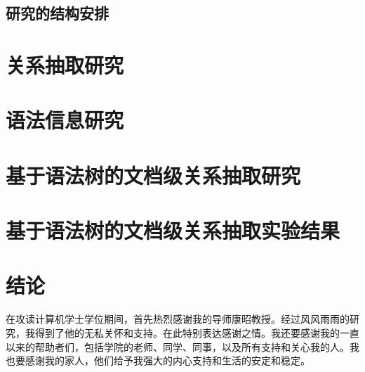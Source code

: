 \documentclass[bachelor]{thesis-uestc}
\begin{document}
\section{研究的结构安排}

\begin{comment}
    课题的方案论证，包括课题的主要任务，功能要求，性能指标等
    课题的工作
    A. 理论课题
(a) 理论基础和原理
(b) 理论分析、推导、数学模型
(c) 模型仿真（含数据、曲线等）

also: 图表的标注先写在图表的上方，明天再次询问这个问题
\end{comment}
\chapter{关系抽取研究}

\newpage

\chapter{语法信息研究}
\newpage
\chapter{基于语法树的文档级关系抽取研究}
\newpage
\chapter{基于语法树的文档级关系抽取实验结果}
\newpage
\chapter{结论}
\begin{comment}
    在工作总结的基础上，经过分析、归纳，明确结论：
①系统功能、指标等是否实现或达到课题要求（工程技
术及软件课题）
②理论结果是否正确、所建模型是否合理（理论课题）
41③所阐述的观点是否正确（文科课题）
④本课题有待进一步解决的问题及方向
⑤本人收获及体会
\end{comment}
\thesisacknowledgement
在攻读计算机学士学位期间，首先热烈感谢我的导师康昭教授。经过风风雨雨的研究，我得到了他的无私关怀和支持。在此特别表达感谢之情。我还要感谢我的一直以来的帮助者们，包括学院的老师、同学、同事，以及所有支持和关心我的人。我也要感谢我的家人，他们给予我强大的内心支持和生活的安定和稳定。

\thesisappendix




%
%

%
%



\end{document}
